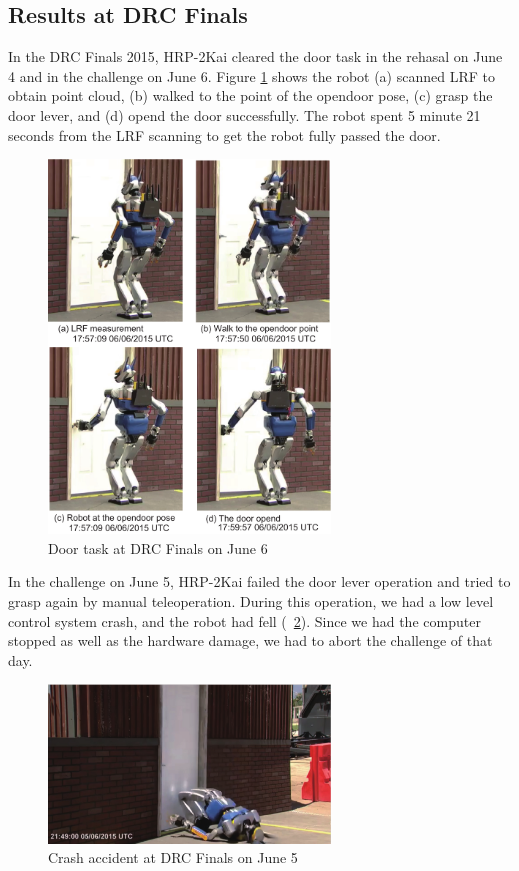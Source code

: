 \subsection{Results at DRC Finals}
%
In the DRC Finals 2015, HRP-2Kai cleared the door task in the rehasal on June 4 and in
the challenge on June 6. Figure \ref{fig:drc_door_aist_day2} shows the robot (a) scanned LRF 
to obtain point cloud, (b) walked to the point of the opendoor pose, (c) grasp the door lever, and (d)
 opend the door successfully. The robot spent 5 minute 21 seconds from the LRF scanning to get the 
robot fully passed the door.
%
\begin{figure}[t]
  \centering
  \includegraphics[width = 7.5cm]{img/drc_door_aist_day2}
  \caption{Door task at DRC Finals on June 6}
  \label{fig:drc_door_aist_day2}
\end{figure}

In the challenge on June 5, HRP-2Kai failed the door lever operation and tried to
grasp again by manual teleoperation. During this operation, we had a low level control system crash, 
and the robot had fell (\figurename~\ref{fig:drc_door_aist_day1}).
Since we had the computer stopped as well as the hardware damage, we had to abort the challenge of that day. 
%
\begin{figure}[t]
  \centering
  \includegraphics[width = 7.5cm]{img/drc_door_aist_day1}
  \caption{Crash accident at DRC Finals on June 5}
  \label{fig:drc_door_aist_day1}
\end{figure}

